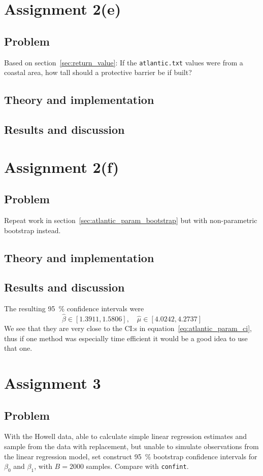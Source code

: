 \documentclass[11pt, a4paper]{article}
\begin{document}
\section{Assignment 2(e)}
\subsection{Problem}
Based on section~\ref{sec:return_value}:
If the \texttt{atlantic.txt} values were from a coastal area,
how tall should a protective barrier be if built?
\subsection{Theory and implementation}
\subsection{Results and discussion}

\section{Assignment 2(f)}
\subsection{Problem}
Repeat work in section~\ref{sec:atlantic_param_bootstrap} but with non-parametric bootstrap instead.
\subsection{Theory and implementation}
\subsection{Results and discussion}
The resulting \SI{95}{\percent} confidence intervals were
$$ \hat\beta \in [\num{1.3911}, \num{1.5806}], \quad
	\hat\mu \in [\num{4.0242}, \num{4.2737}] $$
We see that they are very close to the CI:s in equation~\ref{eq:atlantic_param_ci},
thus if one method was especially time efficient it would be a good idea to use that one.

\section{Assignment 3}
\subsection{Problem}
With the Howell data,
able to calculate simple linear regression estimates and sample from the data with replacement,
but unable to simulate observations from the linear regression model,
set construct \SI{95}{\percent} bootstrap confidence intervals for $\beta_0$ and $\beta_1$,
with $B = \num{2000}$ samples.
Compare with \texttt{confint}.
\end{document}

